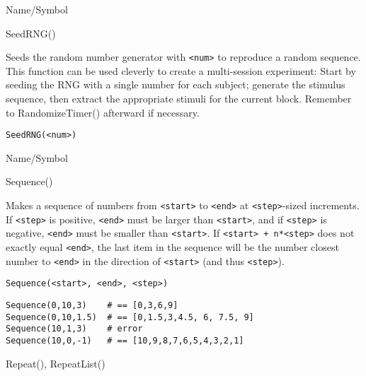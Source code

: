 \rl


\begin{desc}{Name/Symbol}
\item[Name/Symbol]   SeedRNG()

\item[Description]   Seeds the random number generator with \verb+<num>+ to reproduce a 
		random sequence.  This function can be used cleverly to create 
		a multi-session experiment: Start by seeding the RNG with a 
		single number for each subject; generate the stimulus 
		sequence, then extract the appropriate stimuli for the current 
		block. Remember to RandomizeTimer() afterward if necessary.

\item[Usage] 
\begin{verbatim}
SeedRNG(<num>) 
\end{verbatim}

\item[Example]	

\item[See Also]	
\end{desc}

\rl


\begin{desc}{Name/Symbol}
\item[Name/Symbol]   	Sequence()

\item[Description]	Makes a sequence of numbers from \verb+<start>+ to \verb+<end>+ at \verb+<step>+-sized increments. If \verb+<step>+ is positive, \verb+<end>+ must be larger 
		than \verb+<start>+, and if \verb+<step>+ is negative, \verb+<end>+ must be smaller than \verb+<start>+. If \verb!<start> + n*<step>! does not exactly equal 
	\verb+<end>+, the last item in the sequence will be the number 
	closest number to \verb+<end>+ in the direction of \verb+<start>+ (and thus 
	\verb+<step>+).

\item[Usage] 
\begin{verbatim}
Sequence(<start>, <end>, <step>)
\end{verbatim}

\item[Example]
\begin{verbatim}
Sequence(0,10,3)    # == [0,3,6,9]
Sequence(0,10,1.5)  # == [0,1.5,3,4.5, 6, 7.5, 9]
Sequence(10,1,3)    # error
Sequence(10,0,-1)   # == [10,9,8,7,6,5,4,3,2,1]
\end{verbatim}

\item[See Also]    	Repeat(), RepeatList()
\end{desc}

